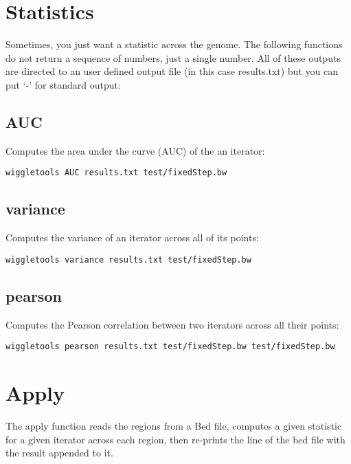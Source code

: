 \documentclass[12pt]{article}
\begin{document}
\section{Statistics}

Sometimes, you just want a statistic across the genome. The following functions do not return a sequence of numbers, just a single number. All of these outputs are directed to an user defined output file (in this case results.txt) but you can put `-' for standard output:

\subsection{AUC}

Computes the area under the curve (AUC) of the an iterator:

\begin{verbatim}
wiggletools AUC results.txt test/fixedStep.bw
\end{verbatim}

\subsection{variance}

Computes the variance of an iterator across all of its points:

\begin{verbatim}
wiggletools variance results.txt test/fixedStep.bw 
\end{verbatim}

\subsection{pearson}

Computes the Pearson correlation between two iterators across all their points:

\begin{verbatim}
wiggletools pearson results.txt test/fixedStep.bw test/fixedStep.bw 
\end{verbatim}

\section{Apply}

The apply function reads the regions from a Bed file, computes a given statistic for a given iterator across each region, then re-prints the line of the bed file with the result appended to it.
\end{document}
